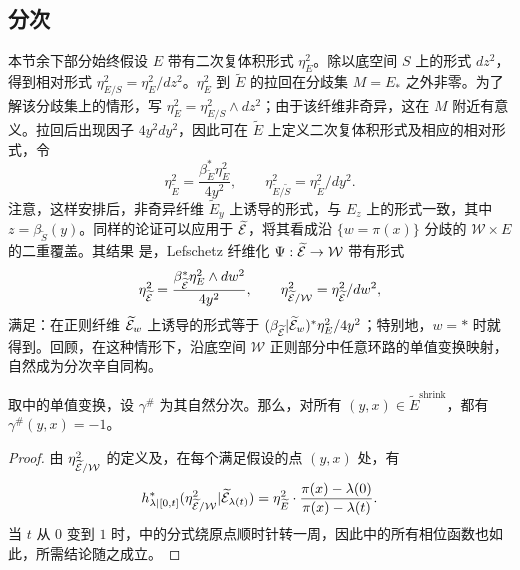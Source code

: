 \subsection{分次}\label{sec:18d}
本节余下部分始终假设 $E$ 带有二次复体积形式 $\eta_E^2$。除以底空间 $S$ 上的形式 $dz^2$，得到相对形式 $\eta_{E/S}^2=\eta_E^2/dz^2$。$\eta_E^2$ 到 $\widetilde E$ 的拉回在分歧集 $M=E_*$ 之外非零。为了解该分歧集上的情形，写 $\eta_E^2=\eta_{E/S}^2\wedge dz^2$；由于该纤维非奇异，这在 $M$ 附近有意义。拉回后出现因子 $4y^2dy^2$，因此可在 $\widetilde E$ 上定义二次复体积形式及相应的相对形式，令
\begin{equation}\label{eq:18.15}
\eta_{\widetilde E}^2=\frac{\beta_{\widetilde E}^*\eta_E^2}{4y^2},\qquad
\eta_{\widetilde E/\widetilde S}^2=\eta_{\widetilde E}^2/dy^2.
\end{equation}
注意，这样安排后，非奇异纤维 $\widetilde E_y$ 上诱导的形式，与 $E_z$ 上的形式一致，其中 $z=\beta_{\widetilde S}(y)$。同样的论证可以应用于 $\widetilde{\mathcal E}$，将其看成沿 $\{w=\pi(x)\}$ 分歧的 $\mathcal W\times E$ 的二重覆盖。其结果
是，Lefschetz 纤维化 $\Psi:\widetilde{\mathcal E}\to\mathcal W$ 带有形式
\[
\eta_{\widetilde{\mathcal E}}^2=\frac{\beta_{\widetilde{\mathcal E}}^*\eta_E^2\wedge dw^2}{4y^2},\qquad
\eta_{\widetilde{\mathcal E}/\mathcal W}^2=\eta_{\widetilde{\mathcal E}}^2/dw^2,
\]
满足：在正则纤维 $\widetilde{\mathcal E}_w$ 上诱导的形式等于 $(\beta_{\widetilde{\mathcal E}}|\widetilde{\mathcal E}_w)^*\eta_E^2/4y^2$；特别地，$w=*$ 时就得到。回顾，在这种情形下，沿底空间 $\mathcal W$ 正则部分中任意环路的单值变换映射，自然成为分次辛自同构。

\begin{lemma}\label{st:18.6}
取中的单值变换，设 $\gamma^\#$ 为其自然分次。那么，对所有 $(y,x)\in\widetilde E^{\mathrm{shrink}}$，都有 $\gamma^\#(y,x)=-1$。
\end{lemma}
\begin{proof}
由 $\eta_{\widetilde{\mathcal E}/\mathcal W}^2$ 的定义及，在每个满足假设的点 $(y,x)$ 处，有
\begin{equation}\label{eq:18.16}
h_{\lambda|[0,t]}^*(\eta_{\widetilde{\mathcal E}/\mathcal W}^2|\widetilde{\mathcal E}_{\lambda(t)})
=\eta_{\widetilde E}^2\cdot\frac{\pi(x)-\lambda(0)}{\pi(x)-\lambda(t)}.
\end{equation}
当 $t$ 从 $0$ 变到 $1$ 时，中的分式绕原点顺时针转一周，因此中的所有相位函数也如此，所需结论随之成立。
\end{proof}

